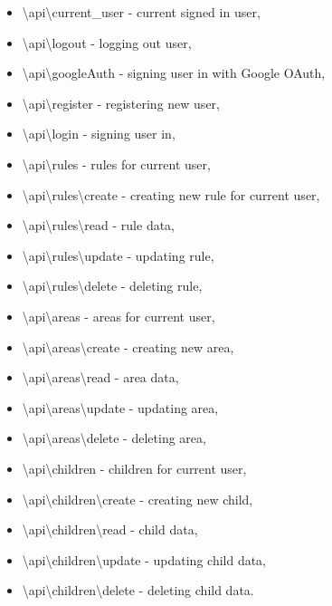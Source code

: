 \documentclass{sprawozdanie-agh}
\begin{document}
			\begin{itemize}
				\item \textbackslash api\textbackslash current\_user - current signed in user,
				\item \textbackslash api\textbackslash logout - logging out user,
				\item \textbackslash api\textbackslash googleAuth - signing user in with Google OAuth,
				\item \textbackslash api\textbackslash register - registering new user,
				\item \textbackslash api\textbackslash login - signing user in,
				\item \textbackslash api\textbackslash rules - rules for current user,
				\item \textbackslash api\textbackslash rules\textbackslash create - creating new rule for current user,
				\item \textbackslash api\textbackslash rules\textbackslash read - rule data,
				\item \textbackslash api\textbackslash rules\textbackslash update - updating rule,
				\item \textbackslash api\textbackslash rules\textbackslash delete - deleting rule,
				\item \textbackslash api\textbackslash areas - areas for current user,
				\item \textbackslash api\textbackslash areas\textbackslash create - creating new area,
				\item \textbackslash api\textbackslash areas\textbackslash read - area data,
				\item \textbackslash api\textbackslash areas\textbackslash update - updating area,
				\item \textbackslash api\textbackslash areas\textbackslash delete - deleting area,	
				\item \textbackslash api\textbackslash children - children for current user,
				\item \textbackslash api\textbackslash children\textbackslash create - creating new child,
				\item \textbackslash api\textbackslash children\textbackslash read - child data,
				\item \textbackslash api\textbackslash children\textbackslash update - updating child data,
				\item \textbackslash api\textbackslash children\textbackslash delete - deleting child data.
			\end{itemize}
\end{document}
